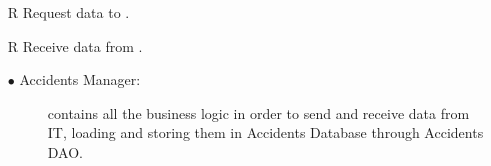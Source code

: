 \documentclass[../DD.tex]{subfiles}
\begin{document}
\begin{itemize}
	\item[R\subs{27}]Request  data to .
	\item[R\subs{28}]Receive  data from .
		\begin{description}
		\item[$\bullet$ Accidents Manager:] contains all the business logic in order to send and receive  data from  IT, loading and storing them in Accidents Database through Accidents DAO.
	\end{description}

\end{itemize}
\end{document}
